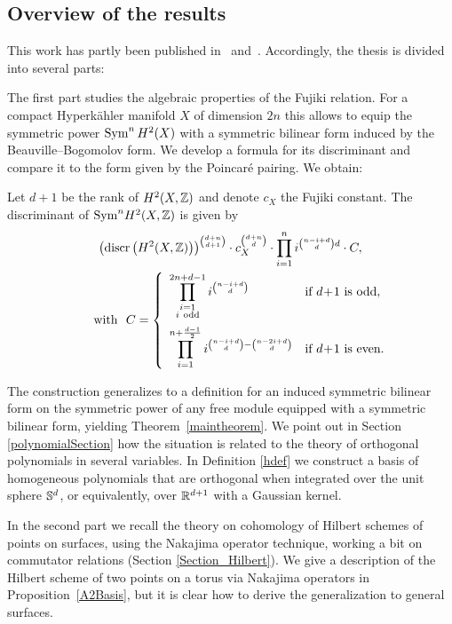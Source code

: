 \subsection{Overview of the results}
This work has partly been published in~\cite{Kapfer2} and~\cite{Kapfer}. 
Accordingly, the thesis is divided into several parts:

The first part \cite{Kapfer} studies the algebraic properties of the Fujiki relation. For a compact Hyperk\"ahler manifold $X$ of dimension $2n$ this allows to equip the symmetric power $\Sym^nH^2(X)$ with a symmetric bilinear form induced by the Beauville--Bogomolov form. We develop a formula for its discriminant and compare it to the form given by the Poincar\'e pairing.
We obtain:
{
\renewcommand{\thetheorem}{\ref{FujikiDiscr}}
\begin{theorem}
Let $d+1$ be the rank of $H^2(X,\Z)$ and denote $c_X$ the Fujiki constant.
The discriminant of $\Sym^n\!H^2(X,\Z)$ is given by
\begin{gather*}
\left(\discr \left(H^2(X,\Z)\right)\right)^{\binom{d+n}{d+1}}\cdot c_X^{\binom{d+n}{d}} \cdot \prod_{i=1}^n i^{\binom{n-i+d}{d}d} 
\cdot C, \\
\qquad \text{with } \ 
C=
\left\{
 \begin{array}{*2{l}p{5cm}}
 \displaystyle\prod_{\substack{i=1 \\ i\ \text{odd}\\\ }}^{2n+d-1}i^{\binom{n-i+d}{d}} &\text{if }d\!+\! 1\text{ is odd}, \\
 \displaystyle\prod_{i=1}^{n+\frac{d-1}{2}} i^{\binom{n-i+d}{d} - \binom{n-2i+d}{d}} &\text{if }d\! +\! 1\text{ is even}.
\end{array}
\right.
\end{gather*}
\end{theorem}
\addtocounter{theorem}{-1}
}
The construction generalizes to a definition for an induced symmetric bilinear form on the symmetric power of any free module equipped with a symmetric bilinear form, yielding Theorem~\ref{maintheorem}. We point out in Section \ref{polynomialSection} how the situation is related to the theory of orthogonal polynomials in several variables.
In Definition \ref{hdef} we construct a basis of homogeneous polynomials that are orthogonal when integrated over the unit sphere $\S^d$, or equivalently, over $\R^{d+1}$ with a Gaussian kernel.

In the second part we recall the theory on cohomology of Hilbert schemes of points on surfaces, using the Nakajima operator technique, working a bit on commutator relations (Section \ref{Section_Hilbert}).
We give a description of the Hilbert scheme of two points on a torus via Nakajima operators in Proposition~\ref{A2Basis}, but it is clear how to derive the generalization to general surfaces.

